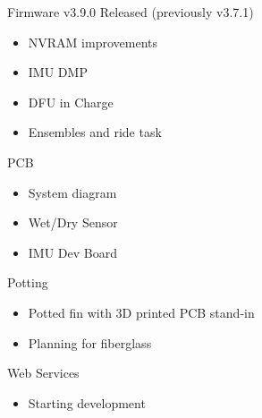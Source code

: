 \begin{frame}{Firmware}
    v3.9.0 Released (previously v3.7.1)
    \begin{itemize}
      \item NVRAM improvements
      \item IMU DMP
      \item DFU in Charge
      \item Ensembles and ride task
    \end{itemize}
\end{frame}

\begin{frame}{PCB}
  \begin{itemize}
    \item System diagram
    \item Wet/Dry Sensor
    \item IMU Dev Board
  \end{itemize}
\end{frame}

\begin{frame}{Potting}
    \begin{itemize}
      \item Potted fin with 3D printed PCB stand-in
      \item Planning for fiberglass
    \end{itemize}
\end{frame}

\begin{frame}{Web Services}
    \begin{itemize}
        \item Starting development
    \end{itemize}
\end{frame}



